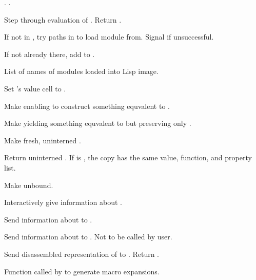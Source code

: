 \begin{LIST}{1cm}
  . .

  Step through evaluation of . Return . 

  If not in , try paths in  to load
  module from. Signal  if unsuccessful.

  If not already there, add  to .

  List of names of modules loaded into Lisp image.

  Set 's value cell to .

  Make  enabling  to construct
  something equvalent to .

  Make  yielding something equvalent to 
  but preserving only .

  Make fresh, uninterned .

  Return uninterned . If  is
  \T, the copy has the same value, function, and property list.

  Make  unbound.

  Interactively give information about .

  Send information about  to .

  Send information about  to . Not to be
  called by user.

  Send disassembled representation of  to
  . Return \retval{\NIL}.

  Function called by  to generate macro expansions.


\end{LIST}
